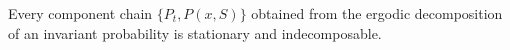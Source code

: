 Every component chain $\{P_t, P(x, S)\}$ obtained from the ergodic decomposition of an invariant probability is stationary and indecomposable.
